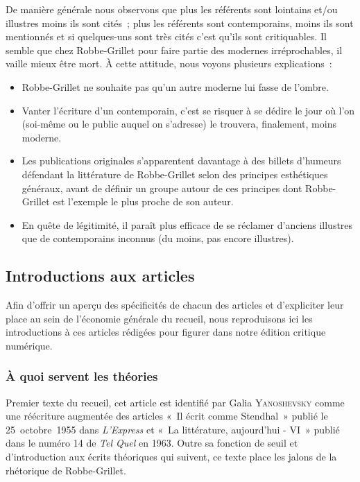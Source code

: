 De manière générale nous observons que plus les référents sont lointains et/ou illustres moins ils sont cités~; plus les référents sont contemporains, moins ils sont mentionnés et si quelques-uns sont très cités c'est qu'ils sont critiquables. Il semble que chez Robbe-Grillet pour faire partie des modernes irréprochables, il vaille mieux être mort. À cette attitude, nous voyons plusieurs explications~:
\begin{itemize}
    \item Robbe-Grillet ne souhaite pas qu'un autre moderne lui fasse de l'ombre.
    \item Vanter l'écriture d'un contemporain, c'est se risquer à se dédire le jour où l'on (soi-même ou le public auquel on s'adresse) le trouvera, finalement, moins moderne.
    \item Les publications originales s'apparentent davantage à des billets d'humeurs défendant la littérature de Robbe-Grillet selon des principes esthétiques généraux, avant de définir un groupe autour de ces principes dont Robbe-Grillet est l'exemple le plus proche de son auteur.
    \item En quête de légitimité, il paraît plus efficace de se réclamer d'anciens illustres que de contemporains inconnus (du moins, pas encore illustres).
\end{itemize}




\subsection{Introductions aux articles}

Afin d'offrir un aperçu des spécificités de chacun des articles et d'expliciter leur place au sein de l'économie générale du recueil, nous reproduisons ici les introductions à ces articles rédigées pour figurer dans notre édition critique numérique.
\subsubsection{À quoi servent les théories}
Premier texte du recueil, cet article est identifié par Galia \textsc{Yanoshevsky} comme une réécriture augmentée des articles «~Il écrit comme Stendhal~» publié le 25~octobre~1955 dans \textit{L'Express} et «~La littérature, aujourd'hui - VI~» publié dans le numéro 14 de \textit{Tel Quel} en 1963. Outre sa fonction de seuil et d'introduction aux écrits théoriques qui suivent, ce texte place les jalons de la rhétorique de Robbe-Grillet.

